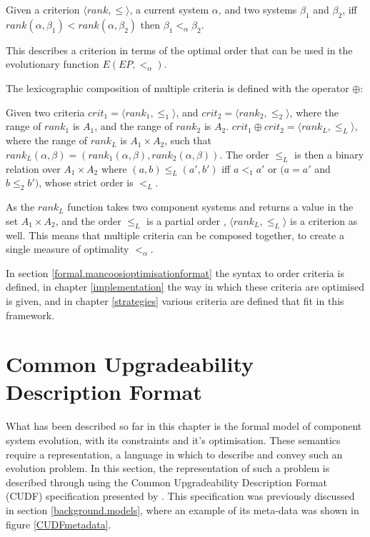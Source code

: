 \begin{defs}
\label{formal.defcrittooptimal}
Given a criterion $\langle rank, \leq \rangle$, 
a current system $\alpha$,
and two systems $\beta_1$ and $\beta_2$,
iff $rank(\alpha,\beta_1) < rank(\alpha,\beta_2)$ then $\beta_1 <_{\alpha} \beta_2$.
\end{defs}
This describes a criterion in terms of the optimal order that can be used in the evolutionary function $E(EP,<_{\alpha})$.

The lexicographic composition of multiple criteria is defined with the operator $\oplus$: 
\begin{defs}
\label{formal.defcritlex}
Given two criteria $crit_1 = \langle rank_1, \leq_{1} \rangle$, and $crit_2 = \langle rank_2, \leq_{2} \rangle$,
where the range of $rank_1$ is $A_1$, and the range of $rank_2$ is $A_2$.
$crit_1 \oplus crit_2 = \langle rank_L,\leq_L \rangle$, where the range of $rank_L$ is $A_1 \times A_2$, such that $rank_L(\alpha,\beta) = (rank_1(\alpha,\beta),rank_2(\alpha,\beta))$.
The order $\leq_L$ is then a binary relation over $A_1 \times A_2$ where $(a,b) \leq_L (a',b')$ iff $a <_1 a'$ or $(a = a'$ and $b \leq_2 b')$,
whose strict order is $<_L$.
\end{defs}
As the $rank_L$ function takes two component systems and returns a value in the set $A_1 \times A_2$,
and the order $\leq_L$ is a partial order \citep{Schroder2003},
$\langle rank_L,\leq_L \rangle$ is a criterion as well.
This means that multiple criteria can be composed together, to create a single measure of optimality $<_{\alpha}$.

In section \ref{formal.mancoosioptimisationformat} the syntax to order criteria is defined, 
in chapter \ref{implementation} the way in which these criteria are optimised is given,
and in chapter \ref{strategies} various criteria are defined that fit in this framework.

\section{Common Upgradeability Description Format}
\label{formal.cudf}
What has been described so far in this chapter is the formal model of component system evolution, with its constraints and it's optimisation.
These semantics require a representation, a language in which to describe and convey such an evolution problem.
In this section, the representation of such a problem is described through using the Common Upgradeability Description Format (CUDF) specification presented by \citep{treinen2009common}.
This specification was previously discussed in section \ref{background.models}, where an example of its meta-data was shown in figure \ref{CUDFmetadata}.

